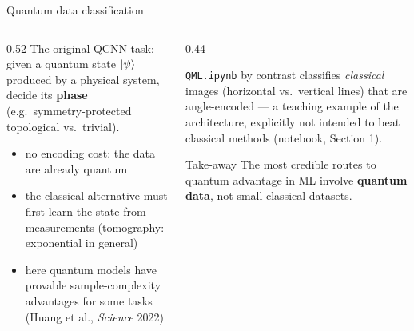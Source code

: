 \documentclass[aspectratio=169,11pt]{beamer}
\newcommand{\key}[1]{{\color{qdark}\textbf{#1}}}
\begin{document}
\begin{frame}[label=fQData]{Quantum data classification}
  \begin{columns}[T]
    \begin{column}{0.52\textwidth}
      \small
      The original QCNN task: given a quantum state $\ket\psi$ produced by a physical system, decide its \key{phase} (e.g.\ symmetry-protected
      topological vs.\ trivial).
      \begin{itemize}\itemsep1pt
        \item no encoding cost: the data are already quantum
        \item the classical alternative must first learn the state from measurements (tomography: exponential in general)
        \item here quantum models have provable sample-complexity advantages for some tasks (Huang et al., \emph{Science} 2022)
      \end{itemize}
    \end{column}
    \begin{column}{0.44\textwidth}
      \begin{block}{\texttt{QML.ipynb} by contrast}
        \scriptsize classifies \emph{classical} images (horizontal vs.\ vertical lines) that are angle-encoded --- a teaching example of the
        architecture, explicitly not intended to beat classical methods (notebook, Section 1).
      \end{block}
      \begin{alertblock}{Take-away}
        \scriptsize The most credible routes to quantum advantage in ML involve \key{quantum data}, not small classical datasets.
      \end{alertblock}
    \end{column}
  \end{columns}
\end{frame}

\end{document}
